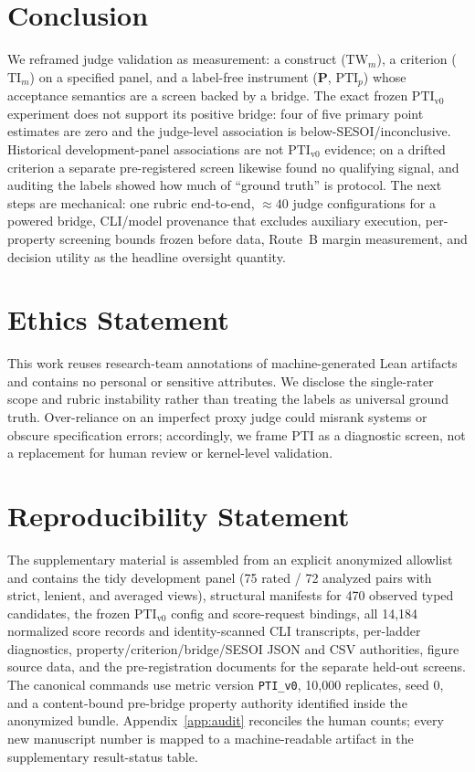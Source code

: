 \documentclass{article}
\newcommand{\TW}{\mathrm{TW}}                    %
\newcommand{\TI}{\mathrm{TI}}                    %
\newcommand{\PTI}{\mathrm{PTI}}                  %
\newcommand{\PTIvzero}{\PTI_{\mathrm{v0}}}        %
\begin{document}
\section{Conclusion}\label{sec:conclusion}
We reframed judge validation as measurement: a construct ($\TW_m$), a criterion ($\TI_m$) on a specified panel, and a label-free instrument ($\mathbf{P}$, $\PTI_p$) whose acceptance semantics are a screen backed by a bridge.
The exact frozen $\PTIvzero$ experiment does not support its positive bridge: four of five primary point estimates are zero and the judge-level association is below-SESOI/inconclusive. Historical development-panel associations are not $\PTIvzero$ evidence; on a drifted criterion a separate pre-registered screen likewise found no qualifying signal, and auditing the labels showed how much of ``ground truth'' is protocol.
The next steps are mechanical: one rubric end-to-end, ${\approx}40$ judge configurations for a powered bridge, CLI/model provenance that excludes auxiliary execution, per-property screening bounds frozen before data, Route~B margin measurement, and decision utility as the headline oversight quantity.


\section*{Ethics Statement}
This work reuses research-team annotations of machine-generated Lean artifacts and contains no personal or sensitive attributes. We disclose the single-rater scope and rubric instability rather than treating the labels as universal ground truth. Over-reliance on an imperfect proxy judge could misrank systems or obscure specification errors; accordingly, we frame PTI as a diagnostic screen, not a replacement for human review or kernel-level validation.

\section*{Reproducibility Statement}
The supplementary material is assembled from an explicit anonymized allowlist and contains the tidy development panel (75 rated / 72 analyzed pairs with strict, lenient, and averaged views), structural manifests for 470 observed typed candidates, the frozen $\PTIvzero$ config and score-request bindings, all 14,184 normalized score records and identity-scanned CLI transcripts, per-ladder diagnostics, property/criterion/bridge/SESOI JSON and CSV authorities, figure source data, and the pre-registration documents for the separate held-out screens. The canonical commands use metric version \texttt{PTI\_v0}, 10,000 replicates, seed 0, and a content-bound pre-bridge property authority identified inside the anonymized bundle. Appendix~\ref{app:audit} reconciles the human counts; every new manuscript number is mapped to a machine-readable artifact in the supplementary result-status table.
\end{document}

